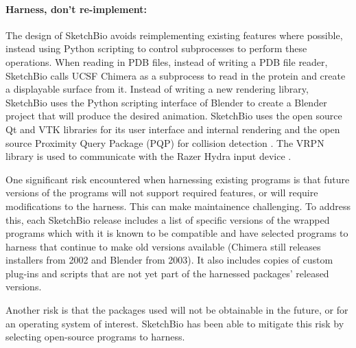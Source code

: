\documentclass[twocolumn]{bmcart}%
\begin{document}
\paragraph*{Harness, don't re-implement:} The design of SketchBio avoids reimplementing existing features where possible, instead using Python scripting to control subprocesses to perform these operations.
When reading in PDB files, instead of writing a PDB file reader, SketchBio calls UCSF Chimera as a subprocess to read in the protein and create a displayable surface from it.
Instead of writing a new rendering library, SketchBio uses the Python scripting interface of Blender to create a Blender project that will produce the desired animation.
SketchBio uses the open source Qt and VTK\cite{VTKbook} libraries for its user interface and internal rendering and the open source Proximity Query Package (PQP) for collision detection \cite{PQP}.
The VRPN library is used to communicate with the Razer Hydra input device \cite{taylor2001vrpn}.

One significant risk encountered when harnessing existing programs is that future versions of the programs will not support required features, or will require modifications to the harness.
This can make maintainence challenging.
To address this, each SketchBio release includes a list of specific versions of the wrapped programs which with it is known to be compatible and have selected programs to harness that continue to make old versions available (Chimera still releases installers from 2002 and Blender from 2003). It also includes copies of custom plug-ins and scripts that are not yet part of the harnessed packages' released versions.

Another risk is that the packages used will not be obtainable in the future, or for an operating system of interest. SketchBio has been able to mitigate this risk by selecting open-source programs to harness.
\end{document}
